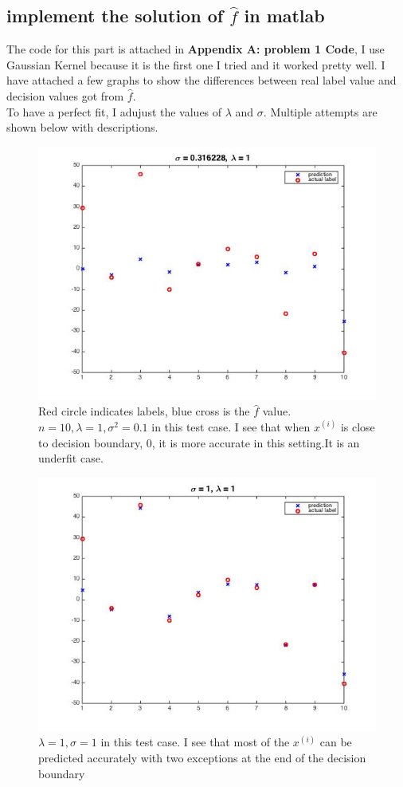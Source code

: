 \documentclass[twoside]{article}
\theoremstyle{definition}
\theoremstyle{definition}
\theoremstyle{remark}
\begin{document}
\subsection{implement the solution of $\hat f$ in matlab}
The code for this part is attached in \textbf{Appendix A: problem 1 Code}, I use Gaussian Kernel because it is the first one I tried and it worked pretty well. I have attached a few graphs to show the differences between real label value and decision values got from $\hat f$.\\
To have a perfect fit, I adujust the values of $\lambda$ and $\sigma$. 
Multiple attempts are shown below with descriptions.
\begin{figure}[H]
\centering
\includegraphics[width=120mm]{problem1Pic1.jpg}
\caption{Red circle indicates labels, blue cross is the $\hat f$ value. $n=10, \lambda =1, \sigma^2 = 0.1$ in this test case. I see that when $x^{(i)}$ is close to decision boundary, 0, it is more accurate in this setting.It is an underfit case.  \label{problem1Pic1}}
\end{figure}

\begin{figure}[H]
\centering
\includegraphics[width=120mm]{problem1Pic2.jpg}
\caption{ $\lambda =1, \sigma = 1$ in this test case. I see that most of the $x^{(i)}$ can be predicted accurately with two exceptions at the end of the decision boundary   \label{problem1Pic2}}
\end{figure}
\end{document}
